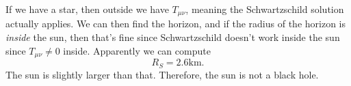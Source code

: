 If we have a star, then outside we have $T_{\mu \nu } $, meaning the Schwartzschild solution actually applies. We can then find the horizon, and if the radius of the horizon is \emph{inside} the sun, then that's fine since Schwartzschild doesn't work inside the sun since $T_{\mu \nu } \neq 0$ inside. Apparently we can compute
\[
	R_S = 2.6 \mathrm{km} 
.\]
The sun is slightly larger than that. Therefore, the sun is not a black hole.
